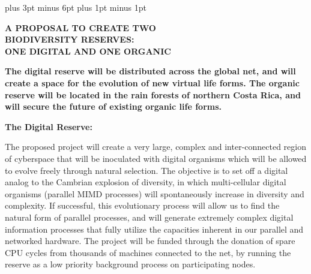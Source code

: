 
\flushbottom
\textheight 9in
\textwidth 6.5in
\textfloatsep 30pt plus 3pt minus 6pt
\parskip 7.5pt plus 1pt minus 1pt
\oddsidemargin 0in
\evensidemargin 0in
\topmargin 0in
\headheight 0in
\headsep 0in

\def\XP{\par\begingroup\parindent 0in\everypar{\hangindent .3in}}
\def\eXP{\par\endgroup}

\def\LP{\par\begingroup\parindent 0in\everypar{\hangindent 0in}}
\def\eLP{\par\endgroup}

\def\IP{\par\begingroup\parindent 0.3in\everypar{\hangindent 0.3in}}
\def\eIP{\par\endgroup}

\def\XPNS{\vspace{7.5pt}\par\begingroup\parskip 0pt\parindent 0in\everypar{\hangindent .3in}}
\def\eXPNS{\par\endgroup}


\thispagestyle{empty}

\begin{center}
{\Large {\bf A PROPOSAL TO CREATE TWO\\
BIODIVERSITY RESERVES:\\
ONE DIGITAL AND ONE ORGANIC\\ }}
\end{center}

\vspace{1cm}

{\large {\bf
The digital reserve will be distributed across the global net, and will
create a space for the evolution of new virtual life forms.  The organic
reserve will be located in the rain forests of northern Costa Rica, and
will secure the future of existing organic life forms.
}}

\begin{center}
{\bf The Digital Reserve:}
\end{center}

The proposed project will create a very large, complex and inter-connected
region of cyberspace that will be inoculated with digital organisms which
will be allowed to evolve freely through natural selection.  The objective
is to set off a digital analog to the Cambrian explosion of diversity, in
which multi-cellular digital organisms (parallel MIMD processes) will
spontaneously increase in diversity and complexity.  If successful, this
evolutionary process will allow us to find the natural form of parallel
processes, and will generate extremely complex digital information
processes that fully utilize the capacities inherent in our parallel and
networked hardware.  The project will be funded through the donation of
spare CPU cycles from thousands of machines connected to the net, by
running the reserve as a low priority background process on participating
nodes.

